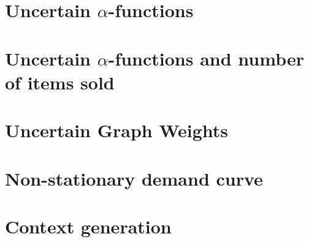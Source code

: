 \documentclass[11pt]{beamer}
\begin{document}
\section{Uncertain $\alpha$-functions}






\section{Uncertain $\alpha$-functions and number of items sold}






\section{Uncertain Graph Weights}






\section{Non-stationary demand curve}






\section{Context generation}




\end{document}
